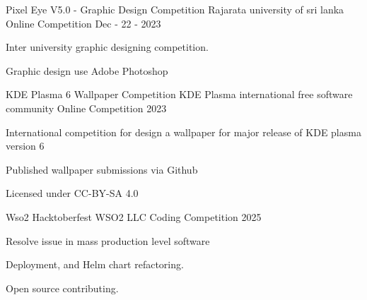 

\begin{cventries}

  \cventry
    {Pixel Eye V5.0 - Graphic Design Competition} %
    {Rajarata university of sri lanka} %
    {Online Competition} %
    {Dec - 22 - 2023} %
    {
      \begin{cvitems} %
        \item {Inter university graphic designing competition.}
        \item {Graphic design use Adobe Photoshop}
      \end{cvitems}
    }

  \cventry
    {KDE Plasma 6 Wallpaper Competition} %
    {KDE Plasma international free software community} %
    {Online Competition} %
    {2023} %
    {
      \begin{cvitems} %
        \item {International competition for design a wallpaper for major release of KDE plasma version 6}
        \item {Published wallpaper submissions via Github}
        \item {Licensed under CC-BY-SA 4.0}
      \end{cvitems}
    }

  \cventry
    {Wso2 Hacktoberfest} %
    {WSO2 LLC} %
    {Coding Competition} %
    {2025} %
    {
      \begin{cvitems} %
        \item {Resolve issue in mass production level software}
        \item {Deployment, and Helm chart refactoring.}
        \item {Open source contributing.}
      \end{cvitems}
    }

\end{cventries}
